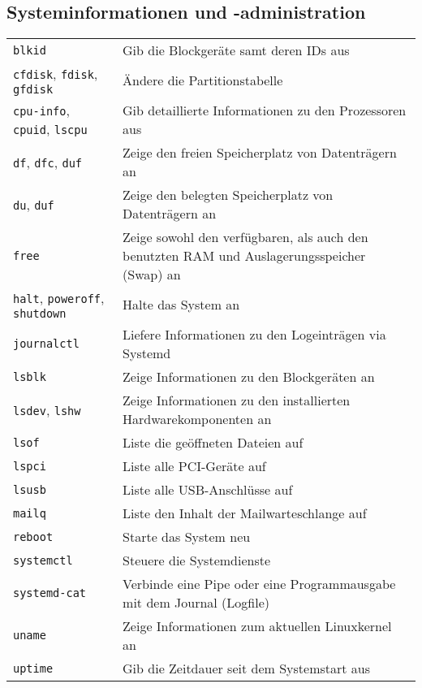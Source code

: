 \documentclass[10pt,a4paper]{article}
\begin{document}
\cheatsheet

\begin{multicols}{2}

\section{Systeminformationen und -administration}
\begin{tabular}{ p{2.5cm} p{8.5cm} }
  \hline
  \texttt{blkid} & Gib die Blockgeräte samt deren IDs aus\\
  \texttt{cfdisk}, \texttt{fdisk}, \texttt{gfdisk} & Ändere die Partitionstabelle \\
  \texttt{cpu-info}, \texttt{cpuid}, \texttt{lscpu} & Gib detaillierte Informationen zu den Prozessoren aus \\
  \texttt{df}, \texttt{dfc}, \texttt{duf} & Zeige den freien Speicherplatz von Datenträgern an \\
  \texttt{du}, \texttt{duf} & Zeige den belegten Speicherplatz von Datenträgern an \\
  \texttt{free} & Zeige sowohl den verfügbaren, als auch den benutzten RAM und Auslagerungsspeicher (Swap) an\\
  \texttt{halt}, \texttt{poweroff}, \texttt{shutdown} & Halte das System an\\
  \texttt{journalctl} & Liefere Informationen zu den Logeinträgen via Systemd \\
  \texttt{lsblk} & Zeige Informationen zu den Blockgeräten an\\
  \texttt{lsdev}, \texttt{lshw} & Zeige Informationen zu den installierten Hardwarekomponenten an\\
  \texttt{lsof} & Liste die geöffneten Dateien auf \\
  \texttt{lspci} & Liste alle PCI-Geräte auf\\
  \texttt{lsusb} & Liste alle USB-Anschlüsse auf\\
  \texttt{mailq} & Liste den Inhalt der Mailwarteschlange auf \\
  \texttt{reboot} & Starte das System neu\\
  \texttt{systemctl} & Steuere die Systemdienste \\
  \texttt{systemd-cat} & Verbinde eine Pipe oder eine Programm\-ausgabe mit dem Journal (Logfile) \\
  \texttt{uname} & Zeige Informationen zum aktuellen Linux\-kernel an \\
  \texttt{uptime} & Gib die Zeitdauer seit dem Systemstart aus \\
  \hline
\end{tabular}


\end{multicols}
\end{document}
